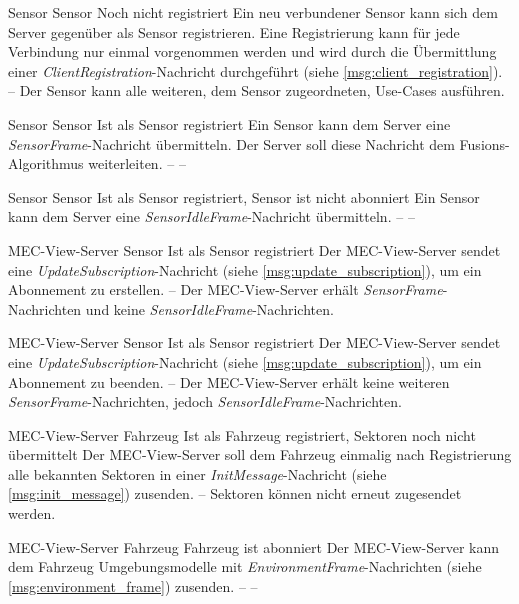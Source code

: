 	{Sensor}
	{Sensor}
	{Noch nicht registriert}
	{Ein neu verbundener Sensor kann sich dem Server gegenüber als Sensor registrieren.
		Eine Registrierung kann für jede Verbindung nur einmal vorgenommen werden und wird durch die Übermittlung einer \textit{ClientRegistration}-Nachricht durchgeführt (siehe \autoref{msg:client_registration}).}
	{--}
	{Der Sensor kann alle weiteren, dem Sensor zugeordneten, Use-Cases ausführen.}

	{Sensor}
	{Sensor}
	{Ist als Sensor registriert}
	{Ein Sensor kann dem Server eine \textit{SensorFrame}-Nachricht übermitteln.
		Der Server soll diese Nachricht dem Fusions-Algorithmus weiterleiten.}
	{--}
	{--}

	{Sensor}
	{Sensor}
	{Ist als Sensor registriert, Sensor ist nicht abonniert}
	{Ein Sensor kann dem Server eine \textit{SensorIdleFrame}-Nachricht übermitteln.}
	{--}
	{--}
	

	{MEC-View-Server}
	{Sensor}
	{Ist als Sensor registriert}
	{Der MEC-View-Server sendet eine \textit{UpdateSubscription}-Nachricht (siehe \autoref{msg:update_subscription}), um ein Abonnement zu erstellen.}
	{--}
	{Der MEC-View-Server erhält \textit{SensorFrame}-Nachrichten und keine \textit{SensorIdleFrame}-Nachrichten.}
	
	{MEC-View-Server}
	{Sensor}
	{Ist als Sensor registriert}
	{Der MEC-View-Server sendet eine \textit{UpdateSubscription}-Nachricht (siehe \autoref{msg:update_subscription}), um ein Abonnement zu beenden.}
	{--}
	{Der MEC-View-Server erhält keine weiteren \textit{SensorFrame}-Nachrichten, jedoch \textit{SensorIdleFrame}-Nachrichten.}
	


	{MEC-View-Server}
	{Fahrzeug}
	{Ist als Fahrzeug registriert, Sektoren noch nicht übermittelt}
	{Der MEC-View-Server soll dem Fahrzeug einmalig nach Registrierung alle bekannten Sektoren in einer \textit{InitMessage}-Nachricht (siehe \autoref{msg:init_message}) zusenden.}
	{--}
	{Sektoren können nicht erneut zugesendet werden.}
	
	{MEC-View-Server}
	{Fahrzeug}
	{Fahrzeug ist abonniert}
	{Der MEC-View-Server kann dem Fahrzeug Umgebungsmodelle mit \textit{EnvironmentFrame}-Nachrichten (siehe \autoref{msg:environment_frame}) zusenden.}
	{--}
	{--}



